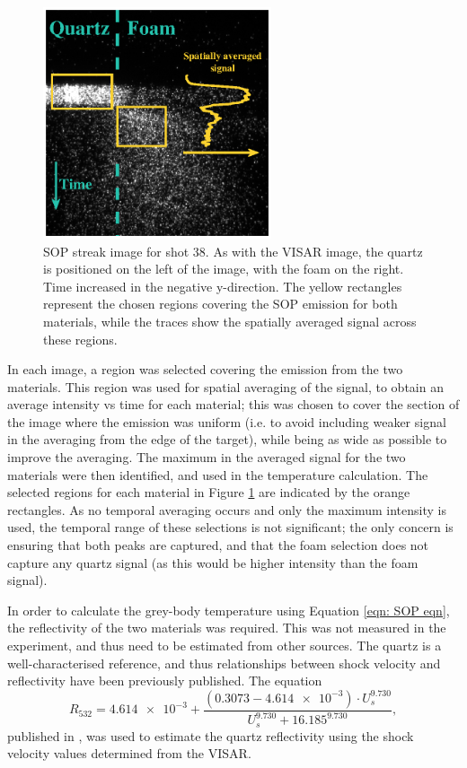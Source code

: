 \begin{figure} [h]
\begin{centering}
\includegraphics[width=0.6\textwidth]{figures/Experiment/SOPImage.eps}%
\caption{\label{fig:SOP data} SOP streak image for shot 38. As with the VISAR image, the quartz is positioned on the left of the image, with the foam on the right. Time increased in the negative y-direction. The yellow rectangles represent the chosen regions covering the SOP emission for both materials, while the traces show the spatially averaged signal across these regions.}
\end{centering}
\end{figure}

In each image, a region was selected covering the emission from the two materials. This region was used for spatial averaging of the signal, to obtain an average intensity vs time for each material; this was chosen to cover the section of the image where the emission was uniform (i.e. to avoid including weaker signal in the averaging from the edge of the target), while being as wide as possible to improve the averaging. The maximum in the averaged signal for the two materials were then identified, and used in the temperature calculation. The selected regions for each material in Figure \ref{fig:SOP data} are indicated by the orange rectangles. As no temporal averaging occurs and only the maximum intensity is used, the temporal range of these selections is not significant; the only concern is ensuring that both peaks are captured, and that the foam selection does not capture any quartz signal (as this would be higher intensity than the foam signal).

In order to calculate the grey-body temperature using Equation \ref{eqn: SOP eqn}, the reflectivity of the two materials was required. This was not measured in the experiment, and thus need to be estimated from other sources. The quartz is a well-characterised reference, and thus relationships between shock velocity and reflectivity have been previously published. The equation \begin{equation} \label{eqn:QuartzR} R_{532} = \num{4.614e-3} + \frac{ (0.3073 - \num{4.614e-3})\cdot U_s^{9.730}}{U_s^{9.730} + 16.185^{9.730}}, \end{equation} published in \cite{Millot2015}, was used to estimate the quartz reflectivity using the shock velocity values determined from the VISAR.

